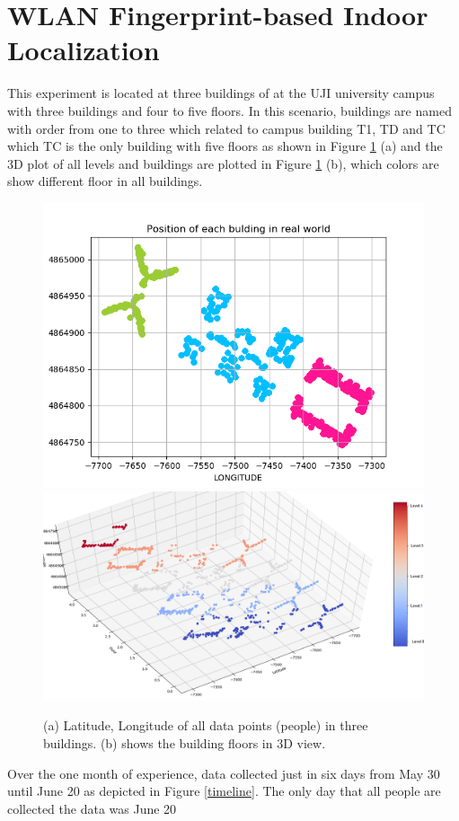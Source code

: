 
\section{WLAN Fingerprint-based Indoor Localization}

This experiment is located at three buildings of at the UJI university campus with three buildings and four to five floors. In this scenario, buildings are named with order from one to three which related to campus building T1, TD and TC which TC is the only building with five floors as shown in Figure \ref{nama} (a) and the 3D plot of all levels and buildings are plotted in Figure \ref{nama} (b), which colors are show different floor in all buildings. 

\begin{figure}[!h]
    \centering
    \includegraphics[width = 7 cm]{image/Chapters/Chapter6/LatLong.png}\hfill
    \includegraphics[width = 8 cm]{image/Chapters/Chapter6/LatLongFloor.png}
    \\[\smallskipamount]    
    \caption{(a) Latitude, Longitude of all data points (people) in three buildings. (b) shows the building floors in 3D view.}
    \label{nama}
\end{figure}


Over the one month of experience, data collected just in six days from May 30 until June 20 as depicted in Figure \ref{timeline}. The only day that all people are collected the data was June 20



